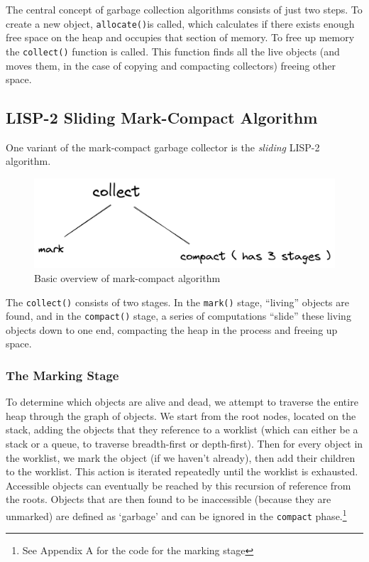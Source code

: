 \documentclass[index]{subfiles}
\begin{document}
The central concept of garbage collection algorithms consists of just two steps. To create a new object, \verb+allocate()+is called, which calculates if there exists enough free space on the heap and occupies that section of memory. To free up memory the \verb+collect()+\cite{gc_handbook} function is called. This function finds all the live objects (and moves them, in the case of copying and compacting collectors) freeing other space. %

\subsection{LISP-2 Sliding Mark-Compact Algorithm}

One variant of the mark-compact garbage collector is the \textit{sliding} LISP-2 algorithm.

\begin{figure}[H]
    \centering
    \includegraphics[scale=0.3]{pics/mark-compact-overview.png}
    \caption{Basic overview of mark-compact algorithm}
\end{figure}

The \verb+collect()+ consists of two stages. In the \verb+mark()+ stage, ``living'' objects are found, and in the \verb+compact()+ stage, a series of computations ``slide'' these living objects down to one end, compacting the heap in the process and freeing up space\cite[Chapter~3]{gc_handbook}.

\subsubsection{The Marking Stage}

To determine which objects are alive and dead, we attempt to traverse the entire heap through the graph of objects. We start from the root nodes, located on the stack\cites[Ch~3~Marking]{redhat_openjdk}[Chapter~3]{gc_handbook}, adding the objects that they reference to a worklist (which can either be a stack or a queue, to traverse breadth-first or depth-first). Then for every object in the worklist, we mark the object (if we haven't already), then add their children to the worklist. This action is iterated repeatedly until the worklist is exhausted. Accessible objects can eventually be reached by this recursion of reference from the roots. Objects that are then found to be inaccessible (because they are unmarked) are defined as `garbage' and can be ignored in the \verb+compact+ phase.\footnote{See Appendix A for the code for the marking stage}
\end{document}
